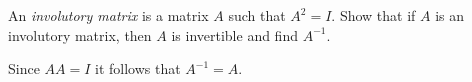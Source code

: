 
\begin{Exercise}[
name={},
title={}, 
difficulty=0,
origin={\cite{MH}}]
An \emph{involutory matrix} is a matrix $A$ such that $A^2=I$.
Show that if $A$ is an involutory matrix, then $A$ is invertible and find $A^{-1}$.
\end{Exercise}

\begin{Answer}
Since $AA=I$ it follows that $A^{-1}=A$.
\end{Answer}
